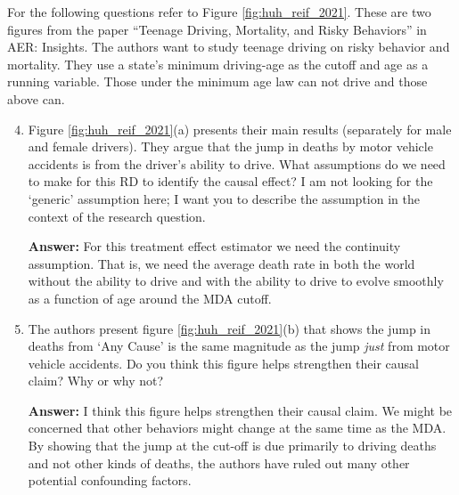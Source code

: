 \documentclass[12pt]{article}
\newcommand{\answer}[1]{{\color{blue_winged_teal}\textbf{Answer:} #1}}
\begin{document}
\bigskip
\noindent
For the following questions refer to Figure \ref{fig:huh_reif_2021}. 
These are two figures from the paper ``Teenage Driving, Mortality, and Risky Behaviors'' in AER: Insights. 
The authors want to study teenage driving on risky behavior and mortality. 
They use a state's minimum driving-age as the cutoff and age as a running variable. 
Those under the minimum age law can not drive and those above can. 

\medskip
\begin{enumerate}
  \setcounter{enumi}{3}
  \item Figure \ref{fig:huh_reif_2021}(a) presents their main results (separately for male and female drivers). 
  They argue that the jump in deaths by motor vehicle accidents is from the driver's ability to drive. 
  What assumptions do we need to make for this RD to identify the causal effect? 
  I am not looking for the `generic' assumption here; I want you to describe the assumption in the context of the research question.

  \answer{
    For this treatment effect estimator we need the continuity assumption.  That is, we need the average death rate in both the world without the ability to drive and with the ability to drive to evolve smoothly as a function of age around the MDA cutoff.
  }
 
  \medskip
  \item The authors present figure \ref{fig:huh_reif_2021}(b) that shows the jump in deaths from `Any Cause' is the same magnitude as the jump \emph{just} from motor vehicle accidents. 
  Do you think this figure helps strengthen their causal claim? Why or why not? 

  \answer{
    I think this figure helps strengthen their causal claim. We might be concerned that other behaviors might change at the same time as the MDA. 
    By showing that the jump at the cut-off is due primarily to driving deaths and not other kinds of deaths, the authors have ruled out many other potential confounding factors.
  }
\end{enumerate}
\end{document}
